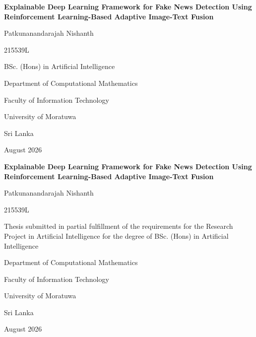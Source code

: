 \documentclass[12pt,a4paper,oneside]{report}
\begin{document}

\begin{titlepage}
\centering
\vspace*{1.0in}
{\Large\bfseries Explainable Deep Learning Framework for Fake News Detection Using Reinforcement Learning-Based Adaptive Image-Text Fusion\par}
\vspace{0.8in}
{\large Patkunanandarajah Nishanth\par}
{\large 215539L\par}
\vspace{0.5in}
{\large BSc. (Hons) in Artificial Intelligence\par}
\vfill
{\large Department of Computational Mathematics\par}
{\large Faculty of Information Technology\par}
{\large University of Moratuwa\par}
{\large Sri Lanka\par}
\vspace{0.4in}
{\large August 2026\par}
\end{titlepage}

\begin{titlepage}
\centering
\vspace*{0.8in}
{\Large\bfseries Explainable Deep Learning Framework for Fake News Detection Using Reinforcement Learning-Based Adaptive Image-Text Fusion\par}
\vspace{0.5in}
{\large Patkunanandarajah Nishanth\par}
{\large 215539L\par}
\vspace{0.5in}
Thesis submitted in partial fulfillment of the requirements for the Research Project in Artificial Intelligence for the degree of BSc. (Hons) in Artificial Intelligence
\vfill
{\large Department of Computational Mathematics\par}
{\large Faculty of Information Technology\par}
{\large University of Moratuwa\par}
{\large Sri Lanka\par}
\vspace{0.4in}
{\large August 2026\par}
\end{titlepage}


\clearpage

\clearpage

\clearpage

\clearpage
\end{document}
